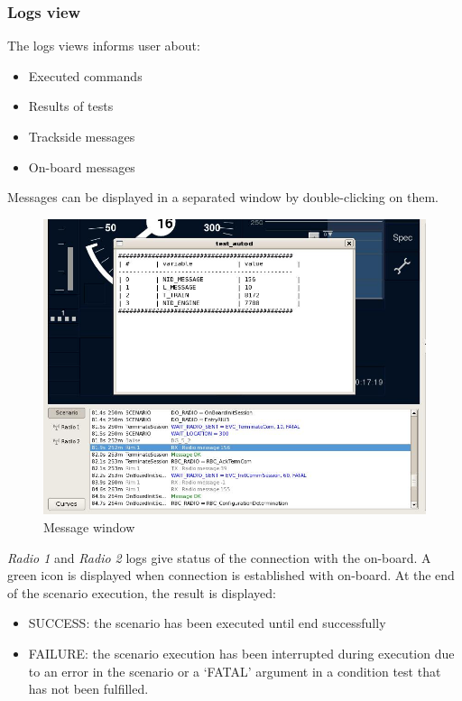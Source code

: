 \documentclass{template/openetcs}
\begin{document}
\subsubsection{Logs view}
The logs views informs user about:
\begin{itemize}
\item Executed commands
\item Results of tests
\item Trackside messages
\item On-board messages
\end{itemize}
Messages can be displayed in a separated window by double-clicking on them.
\newline
\newline
\begin{figure}[!h]
  \centering
  \includegraphics[width=\textwidth]{image/test_runner_message_window}
  \caption{Message window}
  \label{fig:Message window}
\end{figure}
\newline
\newline
\emph{Radio 1} and \emph{Radio 2} logs give status of the connection with the on-board. A green icon is displayed when connection is established with on-board.
At the end of the scenario execution, the result is displayed:
\begin{itemize}
\item SUCCESS: the scenario has been executed until end successfully
\item FAILURE: the scenario execution has been interrupted during execution due to an error in the scenario or a ‘FATAL’ argument in a condition test that has not been fulfilled.
\end{itemize}
\newpage
\end{document}
